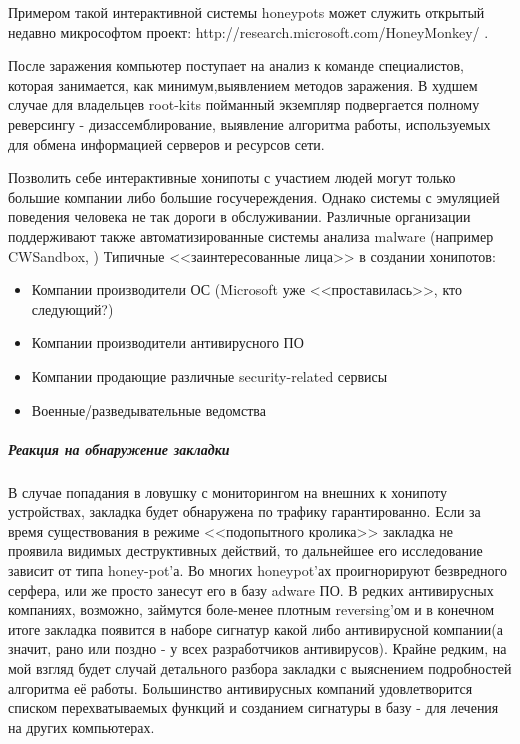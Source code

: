 Примером такой интерактивной системы honeypots может служить открытый
недавно микрософтом проект: http://research.microsoft.com/HoneyMonkey/ .

После заражения компьютер поступает на анализ к команде специалистов,
которая  занимается, как минимум,выявлением методов заражения. В худшем
случае для владельцев root-kits пойманный экземпляр подвергается полному
реверсингу - дизассемблирование, выявление алгоритма работы, используемых
для обмена информацией серверов и ресурсов сети.

Позволить себе интерактивные хонипоты с участием людей могут только большие
компании либо большие  госучереждения. Однако системы с эмуляцией поведения человека
не так дороги в обслуживании. Различные организации поддерживают также автоматизированные
 системы анализа malware (например CWSandbox, )
Типичные <<заинтересованные лица>> в создании
хонипотов:

\begin{itemize}
\item{Компании производители ОС (Microsoft уже <<проставилась>>, кто следующий?)}
\item{Компании производители антивирусного ПО}
\item{Компании продающие различные security-related сервисы}
\item{Военные/разведывательные ведомства}
\end{itemize}

\subparagraph{Реакция на обнаружение закладки}

В случае попадания в ловушку с мониторингом на внешних к хонипоту устройствах,
закладка будет обнаружена по трафику гарантированно. Если за время
существования в режиме <<подопытного кролика>> закладка не проявила
видимых  деструктивных действий, то дальнейшее его исследование
зависит от типа honey-pot'а. Во многих honeypot'ах проигнорируют
безвредного серфера, или же просто занесут его в базу adware ПО.
В редких антивирусных компаниях, возможно, займутся боле-менее плотным
reversing'ом и в конечном итоге закладка появится в
наборе сигнатур какой либо антивирусной компании(а значит, рано или
поздно - у всех разработчиков антивирусов). Крайне редким, на мой взгляд
будет случай детального разбора закладки с выяснением подробностей
алгоритма  её работы. Большинство антивирусных компаний удовлетворится
списком перехватываемых функций и созданием сигнатуры в базу - для
лечения на других компьютерах.
